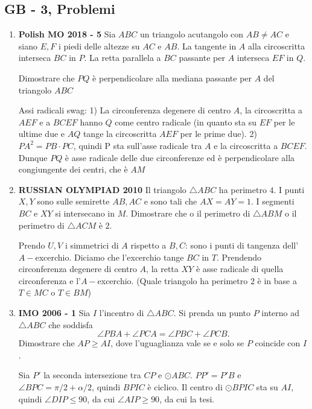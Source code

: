 \subsection{GB - 3, Problemi}
\begin{enumerate}
    \item \textbf{Polish MO 2018 - 5} Sia $ABC$ un triangolo acutangolo con $AB\neq AC$
    e siano $E,F$ i piedi delle altezze su $AC$ e $AB$. La tangente in $A$ alla circoscritta interseca $BC$ in $P$. La retta parallela a $BC$ passante per $A$ interseca $EF$ in $Q$. 
    
    Dimostrare che $PQ$ è perpendicolare alla mediana passante per $A$ del triangolo $ABC$
    
    \begin{sol}Assi radicali swag: 1) La circonferenza degenere di centro $A$, la circoscritta a $AEF$ e a $BCEF$ hanno $Q$ come centro radicale (in quanto sta su $EF$ per le ultime due e $AQ$ tange la circoscritta $AEF$ per le prime due). 2) $PA^2=PB\cdot PC$, quindi P sta sull'asse radicale tra $A$ e la circoscritta a $BCEF$. Dunque $PQ$ è asse radicale delle due circonferenze ed è perpendicolare alla congiungente dei centri, che è $AM$
    \end{sol}
    
    \item \textbf{RUSSIAN OLYMPIAD 2010} Il triangolo $\triangle ABC$ ha perimetro $4$. I punti $X,Y$ sono sulle semirette $AB,AC$ e sono tali che $AX=AY=1$. I segmenti $BC$ e $XY$ si intersecano in $M$. Dimostrare che o il perimetro di $\triangle ABM$ o il perimetro di $\triangle ACM$ è $2$.
    
    \begin{sol}
    Prendo $U,V$ i simmetrici di $A$ rispetto a $B,C$: sono i punti di tangenza dell'$A-$excerchio. Diciamo che l'excerchio tange $BC$ in $T$. Prendendo circonferenza degenere di centro $A$, la retta $XY$ è asse radicale di quella circonferenza e l'$A-$excerchio. (Quale triangolo ha perimetro $2$ è in base a $T\in MC$ o $T\in BM$)
    \end{sol}
    
    \item \textbf{IMO 2006 - 1} Sia $I$ l'incentro di $\triangle ABC$. Si prenda un punto $P$ interno ad $\triangle ABC$ che soddisfa 
    $$\angle PBA + \angle PCA = \angle PBC + \angle PCB.$$
    Dimostrare che $AP\geq AI$, dove l'uguaglianza vale se e solo se $P$ coincide con $I$.
    
    \begin{sol} 
    Sia $P'$ la seconda intersezione tra $CP$ e $\odot ABC$. $PP'=P'B$ e $\angle BPC = \pi/2 + \alpha/2$, quindi $BPIC$ è ciclico. Il centro di $\odot BPIC$ sta su $AI$, quindi $\angle DIP \leq 90$, da cui $\angle AIP\geq 90$, da cui la tesi.
    \end{sol}
    

\end{enumerate}

